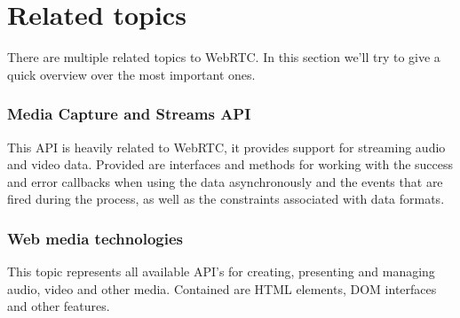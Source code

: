 \section{Related topics}
There are multiple related topics to WebRTC. In this section we'll try to give a quick overview over the most important ones.

\subsubsection{Media Capture and Streams API}
This API is heavily related to WebRTC, it provides support for streaming audio and video data. Provided are interfaces and methods for working with the success and error callbacks when using the data asynchronously and the events that are fired during the process, as well as the constraints associated with data formats.

\subsubsection{Web media technologies}
This topic represents all available API's for creating, presenting and managing audio, video and other media. Contained are HTML elements, DOM interfaces and other features.